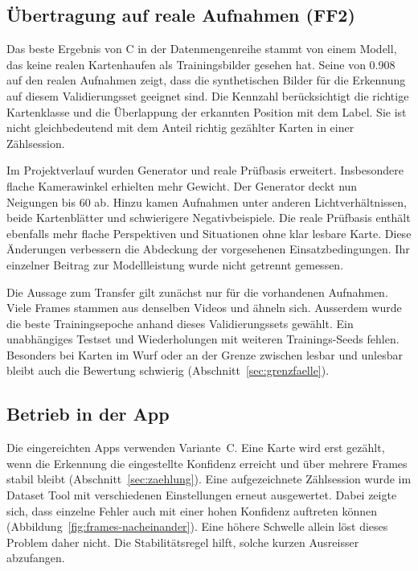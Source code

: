 \subsection{Übertragung auf reale Aufnahmen (FF2)}\label{sec:transfer-real}

Das beste Ergebnis von C in der Datenmengenreihe stammt von einem Modell,
das keine realen Kartenhaufen als Trainingsbilder gesehen hat. Seine
 von 0.908 auf den realen Aufnahmen zeigt, dass die synthetischen
Bilder für die Erkennung auf diesem Validierungsset geeignet sind. Die
Kennzahl berücksichtigt die richtige Kartenklasse und die Überlappung
der erkannten Position mit dem Label. Sie ist nicht gleichbedeutend mit
dem Anteil richtig gezählter Karten in einer Zählsession.

Im Projektverlauf wurden Generator und reale Prüfbasis erweitert.
Insbesondere flache Kamerawinkel erhielten mehr Gewicht. Der Generator
deckt nun Neigungen bis 60\textdegree{} ab. Hinzu kamen Aufnahmen unter
anderen Lichtverhältnissen, beide Kartenblätter und schwierigere
Negativbeispiele. Die reale Prüfbasis enthält ebenfalls mehr flache
Perspektiven und Situationen ohne klar lesbare Karte. Diese Änderungen
verbessern die Abdeckung der vorgesehenen Einsatzbedingungen. Ihr
einzelner Beitrag zur Modellleistung wurde nicht getrennt gemessen.

Die Aussage zum Transfer gilt zunächst nur für die vorhandenen
Aufnahmen. Viele Frames stammen aus denselben Videos und ähneln sich.
Ausserdem wurde die beste Trainingsepoche anhand dieses
Validierungssets gewählt. Ein unabhängiges Testset und Wiederholungen
mit weiteren Trainings-Seeds fehlen. Besonders bei Karten im Wurf oder
an der Grenze zwischen lesbar und unlesbar bleibt auch die Bewertung
schwierig (Abschnitt~\ref{sec:grenzfaelle}).

\subsection{Betrieb in der App}\label{sec:betriebspunkt}

Die eingereichten Apps verwenden Variante~C. Eine Karte wird erst
gezählt, wenn die Erkennung die eingestellte Konfidenz erreicht und über
mehrere Frames stabil bleibt (Abschnitt~\ref{sec:zaehlung}). Eine
aufgezeichnete Zählsession wurde im Dataset Tool mit verschiedenen
Einstellungen erneut ausgewertet. Dabei zeigte sich, dass einzelne
Fehler auch mit einer hohen Konfidenz auftreten können
(Abbildung~\ref{fig:frames-nacheinander}). Eine höhere Schwelle allein
löst dieses Problem daher nicht. Die Stabilitätsregel hilft, solche
kurzen Ausreisser abzufangen.

